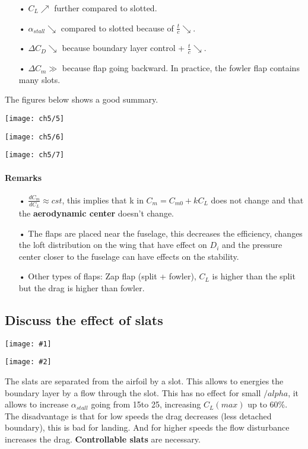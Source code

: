 \documentclass[british,french,11pt, a4paper, openany]{article}
\newcommand{\minifig}[6]{
	\begin{center}%
		\begin{minipage}{#5\textwidth}%
			\texttt{[image: \#1]}%
			\captionof{figure}{}%
			\label{#1}%
		\end{minipage}%
		\begin{minipage}{#6\textwidth}%
			\texttt{[image: \#2]}%
			\captionof{figure}{}%
			\label{#2}%
		\end{minipage}%
	\end{center}
}
\begin{document}
\begin{itemize}
	\item[•] $C_L \nearrow$ further compared to slotted.  
	\item[•] $\alpha _{stall} \searrow$ compared to slotted because of $\frac{t}
	{c}\searrow$.
	\item[•] $\Delta C_D \searrow$ because boundary layer control + $\frac{t}{c} \searrow$.
	\item[•] $\Delta C_m \gg$ because flap going backward. In practice, the fowler flap contains many slots. 
\end{itemize}

The figures below shows a good summary. 

\begin{center}
	\begin{minipage}{0.25\textwidth}
		\texttt{[image: ch5/5]}
	\end{minipage}
	\begin{minipage}{0.25\textwidth}
		\texttt{[image: ch5/6]}
	\end{minipage}
	\begin{minipage}{0.3\textwidth}
		\texttt{[image: ch5/7]}
	\end{minipage}
\end{center}

\paragraph{Remarks}
\begin{itemize}
	\item[•] $\frac{dC_m}{dC_L}\approx cst$, this implies that k in $C_m = C_{m0} + k C_L$ does not change and that the \textbf{aerodynamic center} doesn't change. 
	
	\item[•] The flaps are placed near the fuselage, this decreases the efficiency, changes the loft distribution on the wing that have effect on $D_i$ and the pressure center closer to the fuselage can have effects on the stability. 
	
	\item[•] Other types of flaps: Zap flap (split + fowler), $C_L$ is higher than the split but the drag is higher than fowler. 
\end{itemize}

\subsection{Discuss the effect of slats}
\minifig{ch5/8}{ch5/9}{0.2}{0.15}{0.3}{0.3}
The slats are separated from the airfoil by a slot. This allows to energies the boundary layer by a flow through the slot. This has no effect for small $/alpha$, it allows to increase $\alpha _{stall}$ going from 15\degres to 25\degres, increasing $C_L(max)$ up to 60\%. The disadvantage is that for low speeds the drag decreases (less detached boundary), this is bad for landing. And for higher speeds the flow disturbance increases the drag. \textbf{Controllable slats} are necessary. \\
\end{document}
